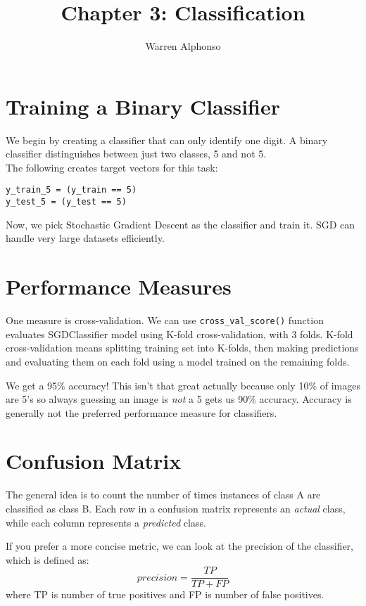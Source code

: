 \documentclass[11pt]{article}
\begin{document}
\author{Warren Alphonso}
\title{Chapter 3: Classification}
\setlength{\parindent}{1cm}
\pagestyle{headings}
\maketitle
\tableofcontents
\section{Training a Binary Classifier}
\indent We begin by creating a classifier that can only identify one digit. A binary classifier distinguishes between just two classes, 5 and not 5. \\
\indent The following creates target vectors for this task: 

\begin{verbatim}
y_train_5 = (y_train == 5) 
y_test_5 = (y_test == 5)
\end{verbatim} 

\indent Now, we pick Stochastic Gradient Descent as the classifier and train it. SGD can handle very large datasets efficiently. 


\section{Performance Measures}

One measure is cross-validation. We can use \verb|cross_val_score()| function evaluates SGDClassifier model using K-fold cross-validation, with 3 folds. K-fold cross-validation means splitting training set into K-folds, then making predictions and evaluating them on each fold using a model trained on the remaining folds. 

We get a 95\% accuracy! This isn't that great actually because only 10\% of images are 5's so always guessing an image is \emph{not} a 5 gets us 90\% accuracy. Accuracy is generally not the preferred performance measure for classifiers. 


\section{Confusion Matrix}

The general idea is to count the number of times instances of class A are classified as class B. Each row in a confusion matrix represents an \emph{actual} class, while each column represents a \emph{predicted} class. 

If you prefer a more concise metric, we can look at the precision of the classifier, which is defined as: 
\[precision = \frac{TP}{TP + FP}\]
where TP is number of true positives and FP is number of false positives. 
\end{document}
